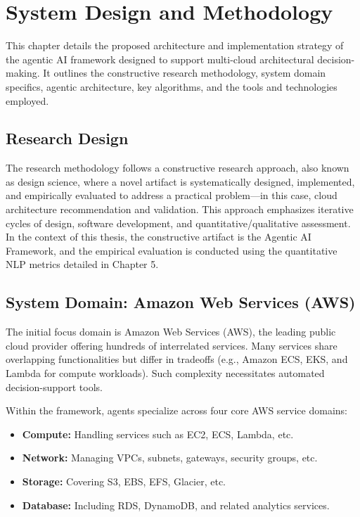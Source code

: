 \chapter{System Design and Methodology}

This chapter details the proposed architecture and implementation strategy of the agentic AI framework designed to support multi-cloud architectural decision-making. It outlines the constructive research methodology, system domain specifics, agentic architecture, key algorithms, and the tools and technologies employed.

\section{Research Design}

The research methodology follows a constructive research approach, also known as design science, where a novel artifact is systematically designed, implemented, and empirically evaluated to address a practical problem—in this case, cloud architecture recommendation and validation. This approach emphasizes iterative cycles of design, software development, and quantitative/qualitative assessment. In the context of this thesis, the constructive artifact is the Agentic AI Framework, and the empirical evaluation is conducted using the quantitative NLP metrics detailed in Chapter 5.

\section{System Domain: Amazon Web Services (AWS)}

The initial focus domain is Amazon Web Services (AWS), the leading public cloud provider offering hundreds of interrelated services. Many services share overlapping functionalities but differ in tradeoffs (e.g., Amazon ECS, EKS, and Lambda for compute workloads). Such complexity necessitates automated decision-support tools.

Within the framework, agents specialize across four core AWS service domains:

\begin{itemize}
    \item \textbf{Compute:} Handling services such as EC2, ECS, Lambda, etc.
    \item \textbf{Network:} Managing VPCs, subnets, gateways, security groups, etc.
    \item \textbf{Storage:} Covering S3, EBS, EFS, Glacier, etc.
    \item \textbf{Database:} Including RDS, DynamoDB, and related analytics services.
\end{itemize}

